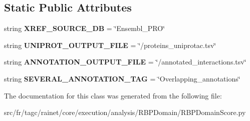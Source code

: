 \subsection*{Static Public Attributes}
\begin{DoxyCompactItemize}
\item 
\hypertarget{classRBPDomainScore_1_1RBPDomainScore_a1ed6fe694de7ca6aad86037bbbd42ce0}{string {\bfseries X\-R\-E\-F\-\_\-\-S\-O\-U\-R\-C\-E\-\_\-\-D\-B} = \char`\"{}Ensembl\-\_\-\-P\-R\-O\char`\"{}}\label{classRBPDomainScore_1_1RBPDomainScore_a1ed6fe694de7ca6aad86037bbbd42ce0}

\item 
\hypertarget{classRBPDomainScore_1_1RBPDomainScore_ab4ef85596fd496dbd0d6e8686adc2cb5}{string {\bfseries U\-N\-I\-P\-R\-O\-T\-\_\-\-O\-U\-T\-P\-U\-T\-\_\-\-F\-I\-L\-E} = \char`\"{}/proteins\-\_\-uniprotac.\-tsv\char`\"{}}\label{classRBPDomainScore_1_1RBPDomainScore_ab4ef85596fd496dbd0d6e8686adc2cb5}

\item 
\hypertarget{classRBPDomainScore_1_1RBPDomainScore_a83bdd6cc6cea37e2e852991d37bf4747}{string {\bfseries A\-N\-N\-O\-T\-A\-T\-I\-O\-N\-\_\-\-O\-U\-T\-P\-U\-T\-\_\-\-F\-I\-L\-E} = \char`\"{}/annotated\-\_\-interactions.\-tsv\char`\"{}}\label{classRBPDomainScore_1_1RBPDomainScore_a83bdd6cc6cea37e2e852991d37bf4747}

\item 
\hypertarget{classRBPDomainScore_1_1RBPDomainScore_a3253b88f9c001967a672206cf1b39126}{string {\bfseries S\-E\-V\-E\-R\-A\-L\-\_\-\-A\-N\-N\-O\-T\-A\-T\-I\-O\-N\-\_\-\-T\-A\-G} = \char`\"{}Overlapping\-\_\-annotations\char`\"{}}\label{classRBPDomainScore_1_1RBPDomainScore_a3253b88f9c001967a672206cf1b39126}

\end{DoxyCompactItemize}


The documentation for this class was generated from the following file\-:\begin{DoxyCompactItemize}
\item 
src/fr/tagc/rainet/core/execution/analysis/\-R\-B\-P\-Domain/R\-B\-P\-Domain\-Score.\-py\end{DoxyCompactItemize}

